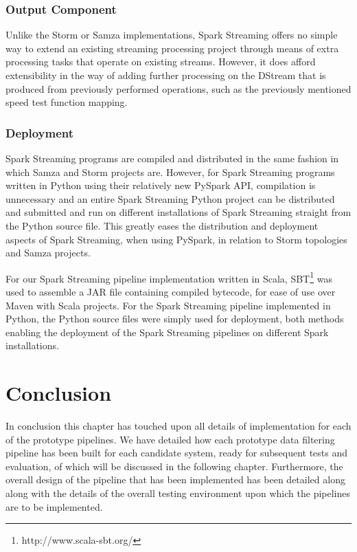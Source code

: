 \subsubsection{Output Component}

Unlike the Storm or Samza implementations, Spark Streaming offers no simple way to extend an existing streaming processing
project through means of extra processing tasks that operate on existing streams. However, it does afford extensibility
in the way of adding further processing on the DStream that is produced from previously performed operations, such
as the previously mentioned speed test function mapping.

\subsubsection{Deployment}

Spark Streaming programs are compiled and distributed in the same fashion in which Samza and Storm projects are. However,
for Spark Streaming programs written in Python using their relatively new PySpark API, compilation is unnecessary and an entire Spark
Streaming Python project can be distributed and submitted and run on different installations of Spark Streaming straight
from the Python source file. This greatly eases the distribution and deployment aspects of Spark Streaming, when using
PySpark, in relation to Storm topologies and Samza projects.

For our Spark Streaming pipeline implementation written in Scala, SBT\footnote{http://www.scala-sbt.org/} was used to assemble a JAR file containing compiled
bytecode, for ease of use over Maven with Scala projects. For the Spark Streaming pipeline implemented in Python, the
Python source files were simply used for deployment, both methods enabling the deployment of the Spark Streaming pipelines on
different Spark installations.





\section{Conclusion} %
\label{sub:implement_conclusion}

In conclusion this chapter has touched upon all details of implementation for each of the prototype pipelines.
We have detailed how each prototype data filtering pipeline has been built for each candidate system, ready
for subsequent tests and evaluation, of which will be discussed in the following chapter. Furthermore, the overall
design of the pipeline that has been implemented has been detailed along along with the details of the overall testing
environment upon which the pipelines are to be implemented.

